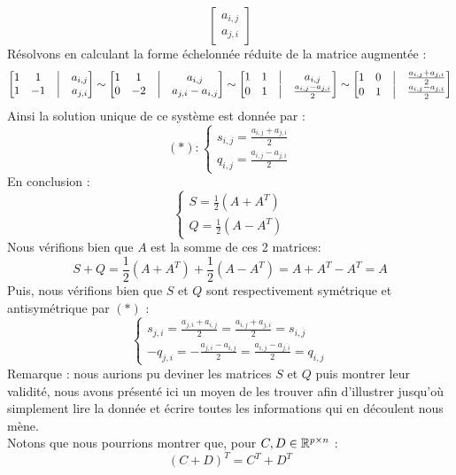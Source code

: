 \begin{exercice}
\begin{enumerate}
$$\begin{bmatrix}
    a_{i,j} \\ a_{j,i}
    \end{bmatrix}
    $$
    Résolvons en calculant la forme échelonnée réduite de la matrice augmentée :
    $$
    \begin{bmatrix}
    1 & 1 & \bigm| & a_{i,j}\\
    1 & -1 & \bigm| & a_{j,i}
    \end{bmatrix} \sim
    \begin{bmatrix}
    1 & 1 & \bigm| & a_{i,j}\\
    0 & -2 & \bigm| & a_{j,i} - a_{i,j}
    \end{bmatrix}\sim
    \begin{bmatrix}
    1 & 1 & \bigm| & a_{i,j}\\
    0 & 1 & \bigm| & \frac{a_{i,j} - a_{j,i}}{2}
    \end{bmatrix}\sim
    \begin{bmatrix}
    1 & 0 & \bigm| &\frac{a_{i,j} + a_{j,i}}{2}\\
    0 & 1 & \bigm| & \frac{a_{i,j} - a_{j,i}}{2}
    \end{bmatrix}
    $$
    Ainsi la solution unique de ce système est donnée par :
    $$
    (*) : \begin{cases}
    s_{i,j} = \frac{a_{i,j} + a_{j,i}}{2}\\
    q_{i,j} = \frac{a_{i,j} - a_{j,i}}{2}
    \end{cases}
    $$
    En conclusion :
    $$
    \begin{cases}
    S = \frac{1}{2}(A + A^T)\\
    Q = \frac{1}{2}(A - A^T)
    \end{cases}
    $$
    Nous vérifions bien que $A$ est la somme de ces 2 matrices:
    $$
    S + Q = \frac{1}{2}(A + A^T) + \frac{1}{2}(A - A^T) = A + A^T - A^T = A
    $$
    Puis, nous vérifions bien que $S$ et $Q$ sont respectivement symétrique et antisymétrique par $(*)$ : 
    $$
    \begin{cases}
    s_{j,i} = \frac{a_{j,i}+a_{i,j}}{2} = \frac{a_{i,j} + a_{j,i}}{2} = s_{i,j}\\
    -q_{j,i} = -\frac{a_{j,i} - a_{i,j}}{2} = \frac{a_{i,j} - a_{j,i}}{2} = q_{i,j}
    \end{cases}
    $$
    Remarque : nous aurions pu deviner les matrices $S$ et $Q$ puis montrer leur validité, nous avons présenté ici un moyen de les trouver afin d'illustrer jusqu'où simplement lire la donnée et écrire toutes les informations qui en découlent nous mène.\\
    
    \noindent Notons que nous pourrions montrer que, pour $C, D \in \mathbb{R}^{p \times n}$ :
    $$(C + D)^T = C^T + D^T
    $$
\end{enumerate}
\, \\
\end{exercice}

